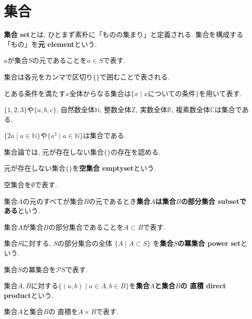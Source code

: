 \section{集合}
{\bf 集合 set}とは, ひとまず素朴に「ものの集まり」と定義される. 集合を構成する「もの」を{\bf 元 element}という.
\begin{Notation}
$a$が集合$S$の元であることを$a\in S$で表す.
\end{Notation}
\begin{Notation}
集合は各元をカンマで区切り$\{\}$で囲むことで表される. 
\end{Notation}
\begin{Notation}
とある条件を満たす$x$全体からなる集合は$\{x\mid x\text{についての条件}\}$を用いて表す.
\end{Notation}
\begin{example}$\{1,2,3\}$や$\{a,b,c\}$, 自然数全体$\mathbb{N}$, 整数全体$\mathbb{Z}$, 実数全体$\mathbb{R}$, 複素数全体$\mathbb{C}$は集合である.
\end{example}
\begin{example}
$\{2a\mid a\in\mathbb{N}\}$や$\{a^3\mid a\in\mathbb{N}\}$は集合である.
\end{example}
集合論では, 元が存在しない集合$\{\}$の存在を認める.
\begin{Def}
元が存在しない集合$\{\}$を{\bf 空集合 emptyset}という.
\end{Def}
\begin{Notation}
空集合を$\emptyset$で表す.
\end{Notation}
\begin{Def}
集合$A$の元のすべてが集合$B$の元であるとき{\bf 集合$A$は集合$B$の部分集合 subsetである}という.  
\end{Def}
\begin{Notation}
集合$A$が集合$B$の部分集合であることを$A\subset B$で表す.
\end{Notation}
\begin{Def}
集合$S$に対する, $S$の部分集合の全体
$\{A\mid A\subset S\}$
を{\bf 集合$S$の冪集合 power set}という.
\end{Def}
\begin{Notation}
集合$S$の冪集合を$\mathcal{P}S$で表す.
\end{Notation}
\begin{Def}
集合$A,B$に対する$\{(a,b)\mid a\in A, b\in B\}$を{\bf 集合$A$と集合$B$の
直積 direct product}という.
\end{Def}
\begin{Notation}
集合$A$と集合$B$の
直積を$A\times B$で表す.
\end{Notation}
\begin{comment}
実は, 集合を「ものの集まり」と素朴に定義することは, 矛盾を孕んでいる. この矛盾を避けるための議論はのちに行う. 
また, 集合論の公理には立ち入らないこととする.
\end{comment}
